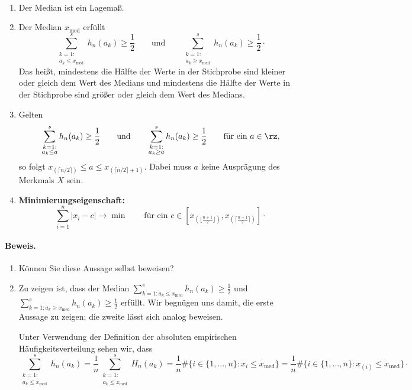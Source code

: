 \begin{satz}\label{satz:median_eigenschaften}  \\
\begin{enumerate}[label=(\alph*)]
    \item Der Median ist ein \gls{Lagemaß}.
    \item Der Median $x_{\mathrm{med}}$ erfüllt
    \[
        \sum_{\substack{k=1:\\ a_k\leq x_{\mathrm{med}}}}^s h_n(a_k) \geq \frac12
        \qquad\text{und}\qquad
        \sum_{\substack{k=1:\\ a_k\geq x_{\mathrm{med}}}}^s h_n(a_k) \geq \frac12 \cdot
    \]
    Das heißt, mindestens die Hälfte der Werte in der Stichprobe sind kleiner oder gleich dem Wert des Medians und mindestens die Hälfte der Werte in der Stichprobe sind größer oder gleich dem Wert des Medians.
    \item Gelten
    \[
        \sum_{\substack{k=1:\\ a_k\leq a}}^s h_n(a_k)\geq\frac12 \qquad\text{und}\qquad \sum_{\substack{k=1:\\ a_k\geq a}}^s h_n(a_k)\geq\frac12 \qquad\text{für ein } a\in\rz ,
    \]
    so folgt $x_{(\lceil n/2\rceil)} \leq a \leq x_{(\lceil n/2\rceil+1)}$.
    Dabei muss $a$ keine Ausprägung des \gls{Merkmal}s $X$ sein.
    \item \textbf{Minimierungseigenschaft:}
    \[
        \sum_{i=1}^n |x_i-c| \to \min \qquad \text{für ein } c\in\left[x_{\left(\lfloor\frac{n+1}2\rfloor\right)}, x_{\left(\lceil\frac{n+1}2\rceil\right)}\right] \cdot
    \]
\end{enumerate}
\paragraph{Beweis.}
    \begin{enumerate}[label=(\alph*)]
        \item Können Sie diese Aussage selbst beweisen?
        \item Zu zeigen ist, dass der Median $\sum_{k=1: a_k\leq x_{\mathrm{med}}}^s h_n(a_k)\geq\frac12$ und $\sum_{k=1: a_k\geq x_{\mathrm{med}}}^s h_n(a_k)\geq\frac12$ erfüllt.
        Wir begnügen uns damit, die erste Aussage zu zeigen; die zweite lässt sich analog beweisen.

        Unter Verwendung der Definition der absoluten empirischen Häufigkeitsverteilung sehen wir, dass
        \[
            \sum_{\substack{k=1:\\ a_k\leq x_{\mathrm{med}}}}^s h_n(a_k)
            = \frac1n \sum_{\substack{k=1:\\ a_k\leq x_{\mathrm{med}}}}^s H_n(a_k)
            = \frac1n \#\{i\in\{1,\dots,n\}: x_i\leq x_{\mathrm{med}}\}
            = \frac1n \#\{i\in\{1,\dots,n\}: x_{(i)}\leq x_{\mathrm{med}}\} \cdot
        \]


\end{enumerate}
\end{satz}
